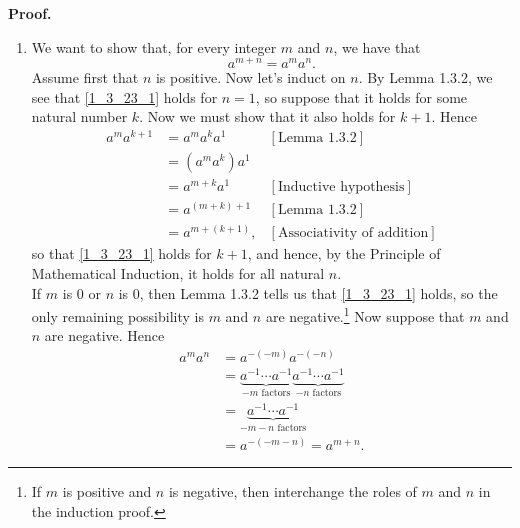 \begin{enumerate}
      \textbf{Proof.}

      \begin{enumerate}
         \item We want to show that, for every integer $m$ and $n$, we have that
               \begin{equation}
                  a^{m + n} = a^ma^n. \label{1_3_23_1}
               \end{equation}
               Assume first that $n$ is positive. Now let's induct on $n$. By
               Lemma 1.3.2, we see that \eqref{1_3_23_1} holds for $n = 1$, so 
               suppose that it holds for some natural number $k$. Now we must 
               show that it also holds for $k + 1$. Hence
               \begin{align*}
                  a^ma^{k+1} &= a^ma^ka^1 &[\text{Lemma 1.3.2}] \\
                             &= (a^ma^k)a^1 \\
                             &= a^{m+k}a^1 &[\text{Inductive hypothesis}] \\
                             &= a^{(m+k)+1} &[\text{Lemma 1.3.2}] \\
                             &= a^{m+(k+1)}, &[\text{Associativity of addition}]
               \end{align*}
               so that \eqref{1_3_23_1} holds for $k + 1$, and hence, by the 
               Principle of Mathematical Induction, it holds for all natural
               $n$. \\
         
               If $m$ is 0 or $n$ is 0, then Lemma 1.3.2 tells us that
               \eqref{1_3_23_1} holds, so the only remaining possibility is $m$ 
               and $n$ are negative.\footnote{If $m$ is positive and $n$ is
               negative, then interchange the roles of $m$ and $n$ in the 
               induction proof.} Now suppose that $m$ and $n$ are negative.
               Hence
               \begin{align*}
                  a^ma^n &= a^{-(-m)}a^{-(-n)} \\
                     &= \underbrace{a^{-1}\cdots a^{-1}}_{-m \text{ factors}}
                        \underbrace{a^{-1}\cdots a^{-1}}_{-n \text{ factors}} \\
                     &= \underbrace{a^{-1}\cdots a^{-1}}_{-m-n\text{ factors}}\\
                     &= a^{-(-m-n)} = a^{m+n}.
               \end{align*}


\end{enumerate}
\end{enumerate}
